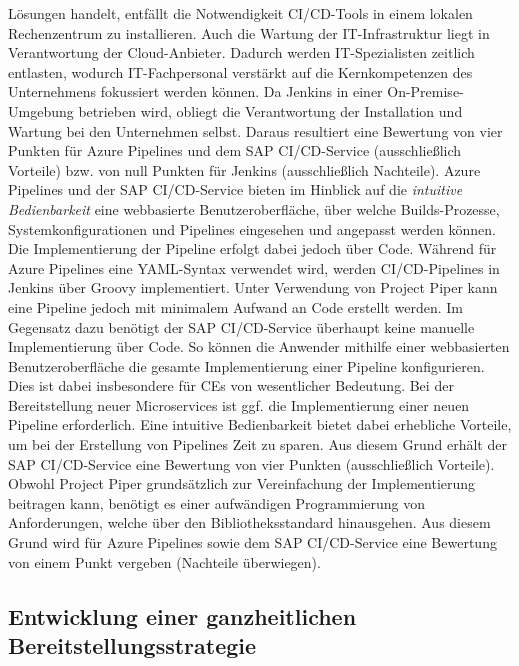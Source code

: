 Lösungen handelt, entfällt die Notwendigkeit CI/CD-Tools in einem lokalen Rechenzentrum zu installieren. Auch die Wartung der IT-Infrastruktur liegt in Verantwortung der Cloud-Anbieter. Dadurch werden IT-Spezialisten zeitlich entlasten, wodurch IT-Fachpersonal verstärkt auf die Kernkompetenzen des Unternehmens fokussiert werden können. Da Jenkins in einer On-Premise-Umgebung betrieben wird, obliegt die Verantwortung der Installation und Wartung bei den Unternehmen selbst. Daraus resultiert eine Bewertung von vier Punkten für Azure Pipelines und dem SAP CI/CD-Service (ausschließlich Vorteile) bzw. von null Punkten für Jenkins (ausschließlich Nachteile). Azure Pipelines und der SAP CI/CD-Service bieten im Hinblick auf die \textit{intuitive Bedienbarkeit} eine webbasierte Benutzeroberfläche, über welche Builds-Prozesse, Systemkonfigurationen und Pipelines eingesehen und angepasst werden können. Die Implementierung der Pipeline erfolgt dabei jedoch über Code. Während für Azure Pipelines eine YAML-Syntax verwendet wird, werden CI/CD-Pipelines in Jenkins über Groovy implementiert. Unter Verwendung von Project Piper kann eine Pipeline jedoch mit minimalem Aufwand an Code erstellt werden. Im Gegensatz dazu benötigt der SAP CI/CD-Service überhaupt keine manuelle Implementierung über Code. So können die Anwender mithilfe einer webbasierten Benutzeroberfläche die gesamte Implementierung einer Pipeline konfigurieren. Dies ist dabei insbesondere für CEs von wesentlicher Bedeutung. Bei der Bereitstellung neuer Microservices ist ggf. die Implementierung einer neuen Pipeline erforderlich. Eine intuitive Bedienbarkeit bietet dabei erhebliche Vorteile, um bei der Erstellung von Pipelines Zeit zu sparen. Aus diesem Grund erhält der SAP CI/CD-Service eine Bewertung von vier Punkten (ausschließlich Vorteile). Obwohl Project Piper grundsätzlich zur Vereinfachung der Implementierung beitragen kann, benötigt es einer aufwändigen Programmierung von Anforderungen, welche über den Bibliotheksstandard hinausgehen. Aus diesem Grund wird für Azure Pipelines sowie dem SAP CI/CD-Service eine Bewertung von einem Punkt vergeben (Nachteile überwiegen).

\subsection{Entwicklung einer ganzheitlichen Bereitstellungsstrategie}
 
